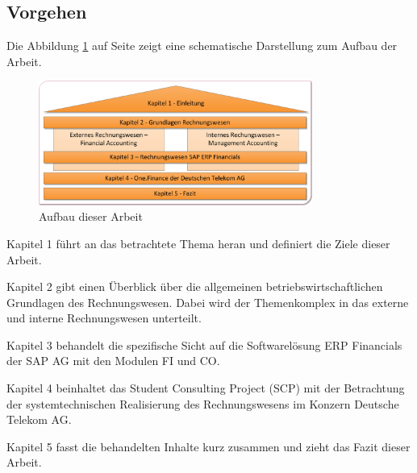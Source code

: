 \subsection{Vorgehen}
Die Abbildung \ref{abbeinleitung} auf Seite \pageref{abbeinleitung} zeigt eine schematische Darstellung zum Aufbau der Arbeit.
\begin{figure}[htbp]
\begin{center}
\includegraphics[width=0.8\textwidth]{Images/einleitung.png}
\caption[Aufbau dieser Arbeit]{Aufbau dieser Arbeit}
\label{abbeinleitung}
\end{center}
\end{figure}
\begin{compactitem}
\item Kapitel 1 führt an das betrachtete Thema heran und definiert die Ziele dieser Arbeit.
\item Kapitel 2 gibt einen Überblick über die allgemeinen betriebswirtschaftlichen Grundlagen des Rechnungswesen. Dabei wird der Themenkomplex in das externe und interne Rechnungswesen unterteilt.
\item Kapitel 3 behandelt die spezifische Sicht auf die Softwarelösung ERP Financials der SAP AG mit den Modulen FI und CO.
\item Kapitel 4 beinhaltet das Student Consulting Project (SCP) mit der Betrachtung der systemtechnischen Realisierung des Rechnungswesens im Konzern Deutsche Telekom AG.
\item Kapitel 5 fasst die behandelten Inhalte kurz zusammen und zieht das Fazit dieser Arbeit.
\end{compactitem}
